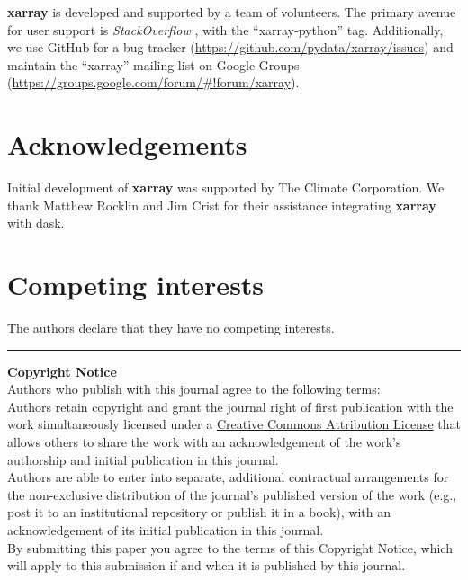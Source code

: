\documentclass{jors}
\begin{document}
\textbf{xarray} is developed and supported by a team of volunteers.
The primary avenue for user support is \textit{StackOverflow} \citep{stackoverflow}, with the ``xarray-python'' tag.
Additionally, we use GitHub for a bug tracker (\url{https://github.com/pydata/xarray/issues}) and maintain the ``xarray'' mailing list on Google Groups (\url{https://groups.google.com/forum/#!forum/xarray}).

\section*{Acknowledgements}

Initial development of \textbf{xarray} was supported by The Climate Corporation.
We thank Matthew Rocklin and Jim Crist for their assistance integrating \textbf{xarray}
with dask.

\section*{Competing interests}

The authors declare that they have no competing interests.



\vspace{2cm}

\rule{\textwidth}{1pt}

{ \bf Copyright Notice} \\
Authors who publish with this journal agree to the following terms: \\

Authors retain copyright and grant the journal right of first publication with the work simultaneously licensed under a  \href{http://creativecommons.org/licenses/by/3.0/}{Creative Commons Attribution License} that allows others to share the work with an acknowledgement of the work's authorship and initial publication in this journal. \\

Authors are able to enter into separate, additional contractual arrangements for the non-exclusive distribution of the journal's published version of the work (e.g., post it to an institutional repository or publish it in a book), with an acknowledgement of its initial publication in this journal. \\

By submitting this paper you agree to the terms of this Copyright Notice, which will apply to this submission if and when it is published by this journal.
\end{document}
